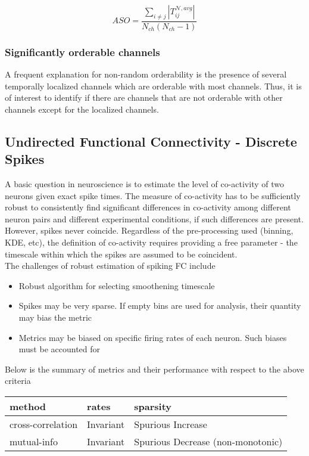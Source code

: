 \documentclass[a4paper,10pt]{article}
\begin{document}
$$ASO = \frac{\sum_{i\neq j} |T^{\mathcal{N}, avg}_{ij}|}{N_{ch}(N_{ch} - 1)}$$

\subsubsection{Significantly orderable channels}

A frequent explanation for non-random orderability is the presence of several 
temporally localized channels which are orderable with most channels. Thus, it 
is of interest to identify if there are channels that are not orderable with 
other channels except for the localized channels. 





\newpage
\subsection{Undirected Functional Connectivity - Discrete Spikes}

A basic question in neuroscience is to estimate the level of co-activity of two neurons given exact spike times. The measure of co-activity has to be sufficiently robust to consistently find significant differences in co-activity among different neuron pairs and different experimental conditions, if such differences are present. However, spikes never coincide. Regardless of the pre-processing used (binning, KDE, etc), the definition of co-activity requires providing a free parameter - the timescale within which the spikes are assumed to be coincident. \\

The challenges of robust estimation of spiking FC include

\begin{itemize}
 \item Robust algorithm for selecting smoothening timescale
 \item Spikes may be very sparse. If empty bins are used for analysis, their quantity may bias the metric
 \item Metrics may be biased on specific firing rates of each neuron. Such biases must be accounted for
\end{itemize}

Below is the summary of metrics and their performance with respect to the above criteria \\

\begin{table}[h!]
\centering
\begin{tabular}{|l | l | l|}
	\hline
   method & rates & sparsity \\ \hline
   cross-correlation & Invariant & Spurious Increase \\
   mutual-info & Invariant & Spurious Decrease (non-monotonic) \\
\end{tabular}

\end{table}
\end{document}
